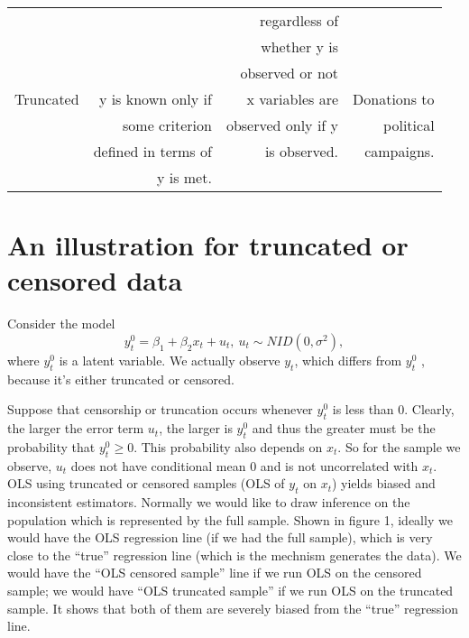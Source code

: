 \begin{table}[htbp]
\begin{tabular}{rrrr}
           &            & regardless of  &            \\

           &            & whether y is  &            \\

           &            & observed or not  &            \\

\hline

Truncated  & y is known only if  & x variables are  & Donations to  \\

           & some criterion  & observed only if y  & political  \\

           & defined in terms of  & is observed.  & campaigns.  \\

           & y is met.  &            &            \\

\end{tabular}
\end{table}



\section{An illustration for truncated or censored data}

Consider the model
\begin{equation}
y_t^0=\beta_1 +\beta_2 x_t +u_t, \ u_t \sim NID(0, \sigma^2),
\end{equation}
where $y_t^0$ is a latent variable.  We actually observe $y_t$, which
differs from $y_t^0$ , because it's either truncated or censored.
 
Suppose that censorship or truncation occurs whenever $y_t^0$ is less
than 0.  Clearly, the larger the error term $u_t$, the larger is
$y_t^0$ and thus the greater must be the probability that $y_t^0 \geq
0$.  This probability also depends on $x_t$.  So for the sample we
observe, $u_t$ does not have conditional mean 0 and is not
uncorrelated with $x_t$.  OLS using truncated or censored samples (OLS
of $y_t$ on $x_t$) yields biased and inconsistent estimators.
Normally we would like to draw inference on the population which is
represented by the full sample.  Shown in figure 1, ideally we would
have the OLS regression line (if we had the full sample), which is
very close to the ``true'' regression line (which is the mechnism
generates the data).  We would have the ``OLS censored sample'' line
if we run OLS on the censored sample; we would have ``OLS truncated
sample'' if we run OLS on the truncated sample.  It shows that both of
them are severely biased from the ``true'' regression line.

